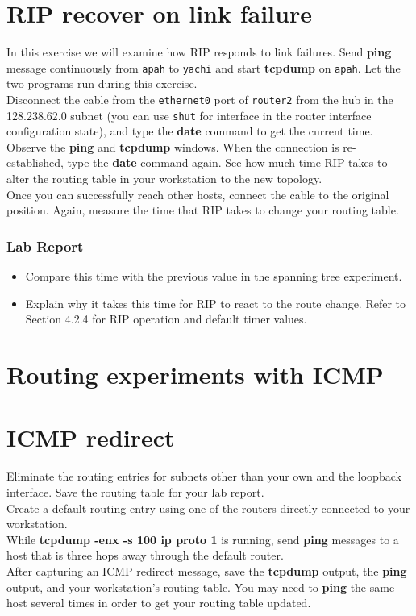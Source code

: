\documentclass{../UTNetLab}
\begin{document}
\section{RIP recover on link failure}
    In this exercise we will examine how RIP responds to link failures.
    Send \textbf{ping} message continuously from \texttt{apah} to \texttt{yachi} and start \textbf{tcpdump} on \texttt{apah}.
    Let the two programs run during this exercise. \\
    Disconnect the cable from the \texttt{ethernet0} port of \texttt{router2} from the hub in the 128.238.62.0 subnet (you can use \texttt{shut} for interface in the router interface configuration state), and type the \textbf{date} command to get the current time. \\
    Observe the \textbf{ping} and \textbf{tcpdump} windows.
    When the connection is re-established, type the \textbf{date}  command again.
    See how much time RIP takes to alter the routing table in your workstation to the new topology. \\
    Once you can successfully reach other hosts, connect the cable to the original position.
    Again, measure the time that RIP takes to change your routing table.
    \subsubsection*{Lab Report}
    \begin{itemize}
        \setlength{\itemindent}{0pt}
        \item Compare this time with the previous value in the spanning tree experiment.
        \item Explain why it takes this time for RIP to react to the route change.
        Refer to Section 4.2.4 for RIP operation and default timer values.
    \end{itemize}


\section*{Routing experiments with ICMP}
\section{ICMP redirect}
    Eliminate the routing entries for subnets other than your own and the loopback interface.
    Save the routing table for your lab report. \\
    Create a default routing entry using one of the routers directly connected to your workstation. \\
    While \textbf{tcpdump -enx -s 100 ip proto 1} is running, send \textbf{ping} messages to a host that is three hops away through the default router. \\
    After capturing an ICMP redirect message, save the \textbf{tcpdump} output, the \textbf{ping} output, and your workstation’s routing table.
    You may need to \textbf{ping} the same host several times in order to get your routing table updated.
\end{document}
